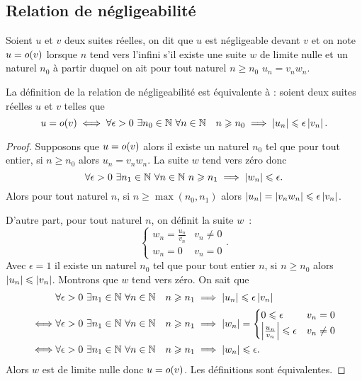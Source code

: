 \subsection{Relation de négligeabilité}

\begin{defdef}
  Soient $u$ et $v$ deux suites réelles, on dit que $u$ est négligeable devant $v$ et on note $u=o\mathopen{}\left(v\right)$ lorsque $n$ tend vers l'infini s'il existe une suite $w$ de limite nulle et un naturel $n_0$ à partir duquel on ait pour tout naturel $n \geqslant n_0$ $u_n = v_n w_n$.
\end{defdef}
\begin{prop}
  La définition de la relation de négligeabilité est équivalente à : soient deux suites réelles $u$ et $v$ telles que
  \begin{equation}
    u=o\mathopen{}\left(v\right) \iff \forall \epsilon > 0 \ \exists n_0 \in \mathbb{N} \ \forall n \in \mathbb{N} \quad n \geqslant n_0 \implies \left\lvert u_n\right\rvert \leqslant \epsilon \left\lvert v_n\right\rvert.
  \end{equation}
\end{prop}
\begin{proof}
  Supposons que $u=o\mathopen{}\left(v\right)$ alors il existe un naturel $n_0$ tel que pour tout entier, si $n \geqslant n_0$ alors $u_n = v_n w_n$. La suite $w$ tend vers zéro donc
  \begin{equation}
    \forall \epsilon > 0 \ \exists n_1 \in \mathbb{N} \ \forall n \in \mathbb{N} \ n \geqslant n_1 \implies \left\lvert w_n\right\rvert \leqslant \epsilon.
  \end{equation}
  Alors pour tout naturel $n$, si $n \geqslant \max(n_0, n_1)$ alors $\left\lvert u_n\right\rvert = \left\lvert v_n w_n\right\rvert \leqslant \epsilon \left\lvert v_n\right\rvert$.

  D'autre part, pour tout naturel $n$, on définit la suite $w$~:
  \begin{equation}
    \begin{cases} w_n=\frac{u_n}{v_n} & v_n \neq 0 \\ w_n=0 & v_n=0\end{cases}.
  \end{equation}
  Avec $\epsilon=1$ il existe un naturel $n_0$ tel que pour tout entier $n$, si $n \geqslant n_0$ alors $\left\lvert u_n\right\rvert \leqslant \left\lvert v_n\right\rvert$. Montrons que $w$ tend vers zéro. On sait que
  \begin{align}
    & \forall \epsilon > 0 \ \exists n_1 \in \mathbb{N} \ \forall n \in \mathbb{N} \quad n \geqslant n_1 \implies \left\lvert u_n\right\rvert \leqslant \epsilon \left\lvert v_n\right\rvert \\ 
    \iff & \forall \epsilon > 0 \ \exists n_1 \in \mathbb{N} \ \forall n \in \mathbb{N} \quad n \geqslant n_1 \implies \left\lvert w_n\right\rvert= \begin{cases} 0 \leqslant \epsilon & v_n=0 \\ \left\lvert\frac{u_n}{v_n}\right\rvert \leqslant \epsilon & v_n\neq 0 \end{cases} \\
    \iff & \forall \epsilon > 0 \ \exists n_1 \in \mathbb{N} \ \forall n \in \mathbb{N} \quad n \geqslant n_1 \implies \left\lvert w_n\right\rvert \leqslant \epsilon.
  \end{align}
  Alors $w$ est de limite nulle donc $u=o\mathopen{}\left(v\right)$. Les définitions sont équivalentes.
\end{proof}

